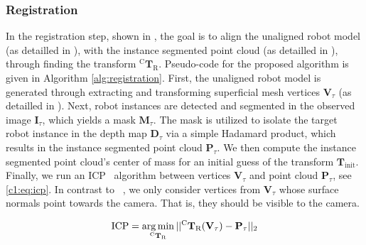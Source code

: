 \subsubsection{Registration}
\label{c1:sec:registration}
In the registration step, shown in , the goal is to align the unaligned robot model (as detailled in ), with the instance segmented point cloud (as detailled in ), through finding the transform $^\text{C}\mathbf{T}_\text{R}$. Pseudo-code for the proposed algorithm is given in Algorithm \ref{alg:registration}.
First, the unaligned robot model is generated through extracting and transforming superficial mesh vertices $\mathbf{V}_\tau$ (as detailled in ).
Next, robot instances are detected and segmented in the observed image $\mathbf{I}_\tau$, which yields a mask $\mathbf{M}_\tau$.
The mask is utilized to isolate the target robot instance in the depth map $\mathbf{D}_\tau$ via a simple Hadamard product, which results in the instance segmented point cloud $\mathbf{P}_\tau$.
We then compute the instance segmented point cloud's center of mass for an initial guess of the transform $\mathbf{T}_\text{init}$. Finally, we run an ICP~\citep{simple_icp} algorithm between vertices $\mathbf{V}_\tau$ and point cloud $\mathbf{P}_\tau$, see \eqref{c1:eq:icp}. In contrast to ~\citep{simple_icp}, we only consider vertices from $\mathbf{V}_\tau$ whose surface normals point towards the camera. That is, they should be visible to the camera.

\begin{equation}
    \label{c1:eq:icp}
    \text{ICP} = \argmin_{^\text{C}\mathbf{T}_\text{R}} || ^\text{C}\mathbf{T}_\text{R}(\mathbf{V}_\tau) - \mathbf{P}_\tau||_2
\end{equation}

